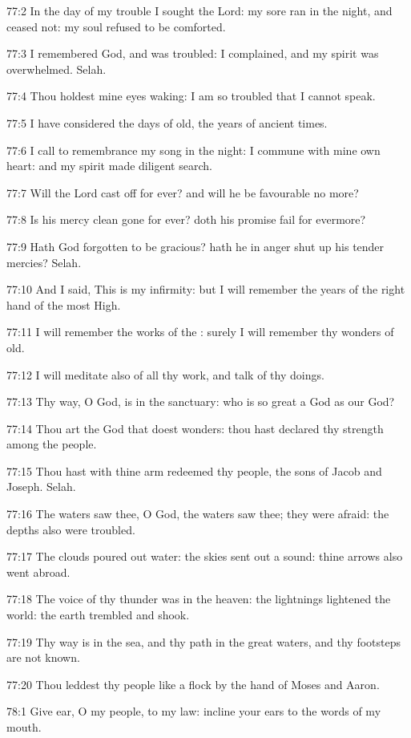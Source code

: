77:2 In the day of my trouble I sought the Lord: my sore ran in the
night, and ceased not: my soul refused to be comforted.

77:3 I remembered God, and was troubled: I complained, and my spirit
was overwhelmed. Selah.

77:4 Thou holdest mine eyes waking: I am so troubled that I cannot
speak.

77:5 I have considered the days of old, the years of ancient times.

77:6 I call to remembrance my song in the night: I commune with mine
own heart: and my spirit made diligent search.

77:7 Will the Lord cast off for ever? and will he be favourable no
more?

77:8 Is his mercy clean gone for ever? doth his promise fail for
evermore?

77:9 Hath God forgotten to be gracious? hath he in anger shut up his
tender mercies? Selah.

77:10 And I said, This is my infirmity: but I will remember the years
of the right hand of the most High.

77:11 I will remember the works of the \LORD: surely I will remember
thy wonders of old.

77:12 I will meditate also of all thy work, and talk of thy doings.

77:13 Thy way, O God, is in the sanctuary: who is so great a God as
our God?

77:14 Thou art the God that doest wonders: thou hast declared thy
strength among the people.

77:15 Thou hast with thine arm redeemed thy people, the sons of Jacob
and Joseph. Selah.

77:16 The waters saw thee, O God, the waters saw thee; they were
afraid: the depths also were troubled.

77:17 The clouds poured out water: the skies sent out a sound: thine
arrows also went abroad.

77:18 The voice of thy thunder was in the heaven: the lightnings
lightened the world: the earth trembled and shook.

77:19 Thy way is in the sea, and thy path in the great waters, and thy
footsteps are not known.

77:20 Thou leddest thy people like a flock by the hand of Moses and
Aaron.



78:1 Give ear, O my people, to my law: incline your ears to the words
of my mouth.

